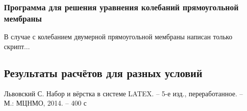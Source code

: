 \documentclass[12pt,a4paper,russian]{report}
\begin{document}
	 \subsubsection{Программа для решения уравнения колебаний прямоугольной мембраны}
	
	В случае с колебанием двумерной прямоугольной мембраны написан только скрипт...	
	
	
	
	\subsection{Результаты расчётов для разных условий}
	
	


	\newpage
	\makeatletter
	\begin{thebibliography}{99}
		
		 Львовский С. Набор и вёрстка в системе LATEX. -- 5-е изд., переработанное. -- М.: МЦНМО, 2014. -- 400 с
		
		
	\end{thebibliography}
	
\end{document}
